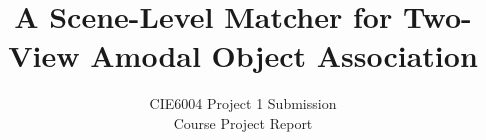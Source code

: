 \documentclass[10pt,twocolumn,letterpaper]{article}
\title{A Scene-Level Matcher for Two-View Amodal Object Association}
\author{CIE6004 Project 1 Submission\\
Course Project Report
}
\begin{document}
\maketitle





{
    \small
    
    
}

% 
\end{document}
